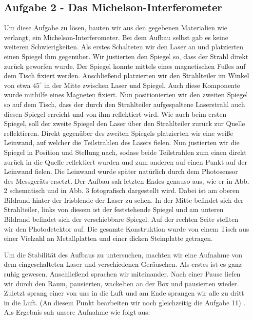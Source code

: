 \subsection*{Aufgabe 2 - Das Michelson-Interferometer}
Um diese Aufgabe zu lösen, bauten wir aus den gegebenen Materialien wie verlangt, ein Michelson-Interferometer. Bei dem Aufbau selbst gab es keine weiteren Schwierigkeiten. 
Als erstes Schalteten wir den Laser an und platzierten einen Spiegel ihm gegenüber. Wir justierten den Spiegel so, dass der Strahl direkt zurück geworfen wurde. Der Spiegel konnte mittels eines magnetischen Fußes auf dem Tisch fixiert werden. Anschließend platzierten wir den Strahlteiler im Winkel von etwa $45^{\circ}$ in der Mitte zwischen Laser und Spiegel. Auch diese Komponente wurde mithilfe eines Magneten fixiert.
Nun positionierten wir den zweiten Spiegel so auf dem Tisch, dass der durch den Strahlteiler aufgespaltene Laserstrahl auch diesen Spiegel erreicht und von ihm reflektiert wird. Wie auch beim ersten Spiegel, soll der zweite Spiegel den Laser über den Strahlteiler zurück zur Quelle reflektieren.
Direkt gegenüber des zweiten Spiegels platzierten wir eine weiße Leinwand, auf welcher die Teilstrahlen des Lasers fielen. Nun justierten wir die Spiegel in Position und Stellung nach, sodass beide Teilstrahlen zum einen direkt zurück in die Quelle reflektiert wurden und zum anderen auf einen Punkt auf der Leinwand fielen. 
Die Leinwand wurde später natürlich durch dem Photosensor des Messgeräts ersetzt.
Der Aufbau sah letzten Endes genauso aus, wie er in Abb. 2 schematisch und in Abb. 3 fotografisch dargestellt wird. Dabei ist am oberen Bildrand hinter der Irisblende der Laser zu sehen. In der Mitte befindet sich der Strahlteiler, links von diesem ist der feststehende Spiegel und am unteren Bildrand befindet sich der verschiebbare Spiegel. Auf der rechten Seite stellten wir den Photodetektor auf. Die gesamte Konstruktion wurde von einem Tisch aus einer Vielzahl an Metallplatten und einer dicken Steinplatte getragen.


Um die Stabilität des Aufbaus zu untersuchen, machten wir eine Aufnahme von dem eingeschalteten Laser und verschiedenen Geräuschen. Als erstes ist es ganz ruhig gewesen. Anschließend sprachen wir miteinander. Nach einer Pause liefen wir durch den Raum, pausierten, wackelten an der Box und pausierten wieder. Zuletzt sprang einer von uns in die Luft und am Ende sprangen wir alle zu dritt in die Luft. (An diesem Punkt bearbeiten wir noch gleichzeitig die Aufgabe 11) .
Als Ergebnis sah unsere Aufnahme wie folgt aus:

